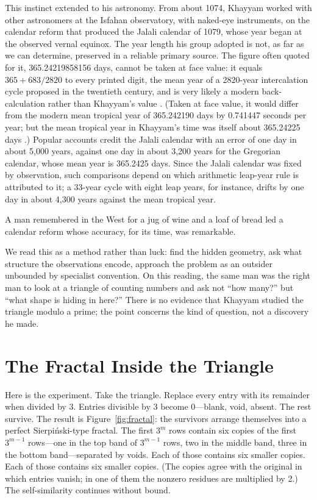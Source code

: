 \documentclass[11pt]{amsart}
\begin{document}
This instinct extended to his astronomy. From about 1074, Khayyam worked with other astronomers at the Isfahan observatory, with naked-eye instruments, on the calendar reform that produced the Jalali calendar of 1079, whose year began at the observed vernal equinox. The year length his group adopted is not, as far as we can determine, preserved in a reliable primary source. The figure often quoted for it, 365.24219858156 days, cannot be taken at face value: it equals $365 + 683/2820$ to every printed digit, the mean year of a 2820-year intercalation cycle proposed in the twentieth century, and is very likely a modern back-calculation rather than Khayyam's value \cite{heydari2004}. (Taken at face value, it would differ from the modern mean tropical year of 365.242190 days by 0.741447 seconds per year; but the mean tropical year in Khayyam's time was itself about 365.24225 days \cite{laskar1986}.) Popular accounts credit the Jalali calendar with an error of one day in about 5,000 years, against one day in about 3,200 years for the Gregorian calendar, whose mean year is 365.2425 days. Since the Jalali calendar was fixed by observation, such comparisons depend on which arithmetic leap-year rule is attributed to it; a 33-year cycle with eight leap years, for instance, drifts by one day in about 4,300 years against the mean tropical year.

A man remembered in the West for a jug of wine and a loaf of bread led a calendar reform whose accuracy, for its time, was remarkable.

We read this as a method rather than luck: find the hidden geometry, ask what structure the observations encode, approach the problem as an outsider unbounded by specialist convention. On this reading, the same man was the right man to look at a triangle of counting numbers and ask not ``how many?'' but ``what shape is hiding in here?'' There is no evidence that Khayyam studied the triangle modulo a prime; the point concerns the kind of question, not a discovery he made.

\section{The Fractal Inside the Triangle}

Here is the experiment. Take the triangle. Replace every entry with its remainder when divided by 3. Entries divisible by 3 become 0---blank, void, absent. The rest survive. The result is Figure~\ref{fig:fractal}: the survivors arrange themselves into a perfect Sierpiński-type fractal. The first $3^m$ rows contain six copies of the first $3^{m-1}$ rows---one in the top band of $3^{m-1}$ rows, two in the middle band, three in the bottom band---separated by voids. Each of those contains six smaller copies. Each of those contains six smaller copies. (The copies agree with the original in which entries vanish; in one of them the nonzero residues are multiplied by 2.) The self-similarity continues without bound.
\end{document}
